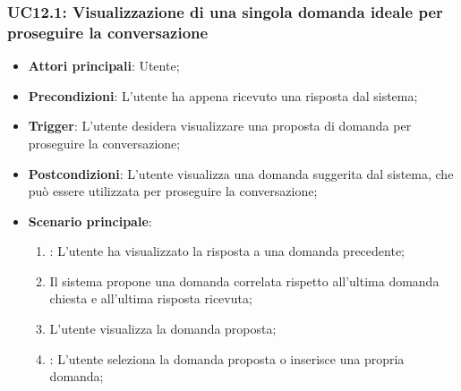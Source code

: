\hypertarget{UC12.1}{}
\subsubsection{UC12.1: Visualizzazione di una singola domanda ideale per proseguire la conversazione}
\begin{itemize}
    \item \textbf{Attori principali}: Utente;
    \item \textbf{Precondizioni}: L'utente ha appena ricevuto una risposta dal sistema;
    \item \textbf{Trigger}: L'utente desidera visualizzare una proposta di domanda per proseguire la conversazione;
    \item \textbf{Postcondizioni}: L'utente visualizza una domanda suggerita dal sistema, che può essere utilizzata per proseguire la conversazione;
    \item \textbf{Scenario principale}:
    \begin{enumerate}
        \item {}: L'utente ha visualizzato la risposta a una domanda precedente;
        \item Il sistema propone una domanda correlata rispetto all'ultima domanda chiesta
        e all'ultima risposta ricevuta;
        \item L'utente visualizza la domanda proposta;
        \item {}: L'utente seleziona la domanda proposta o inserisce una propria domanda;
    \end{enumerate}
\end{itemize}

\hypertarget{UC13}{}
